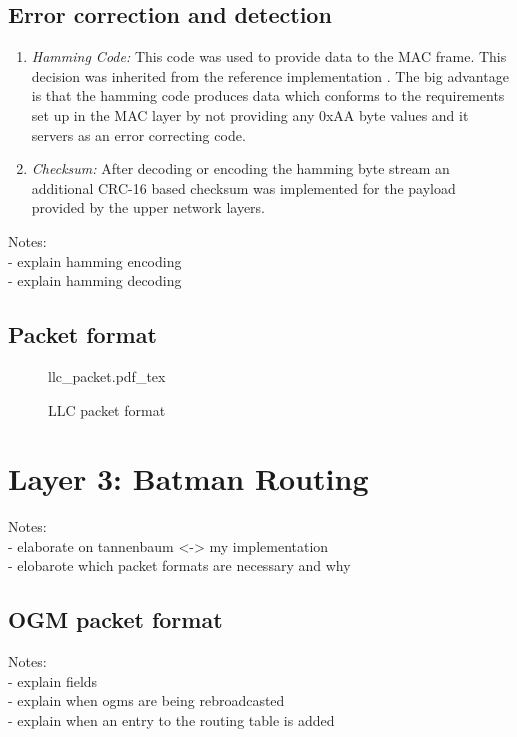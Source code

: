 \subsection{Error correction and detection}
\begin{enumerate}
\item \emph{Hamming Code:} This code was used to provide data to the MAC frame. This decision was inherited from the reference implementation \cite{stahl}. The big advantage is that the hamming code produces data which conforms to the requirements set up in the MAC layer by not providing any 0xAA byte values and it servers as an error correcting code.
\item \emph{Checksum:} After decoding or encoding the hamming byte stream an additional CRC-16 based checksum was implemented for the payload provided by the upper network layers.
\end{enumerate}

Notes: \\
- explain hamming encoding \\
- explain hamming decoding \\

\subsection{Packet format}
\begin{figure}[H]
    \centering
    {llc_packet.pdf_tex}
    \caption{LLC packet format}
\end{figure}

\section{Layer 3: Batman Routing}
Notes:\\
- elaborate on tannenbaum <-> my implementation \\
- elobarote which packet formats are necessary and why \\

\subsection{OGM packet format}
Notes:\\
- explain fields\\
- explain when ogms are being rebroadcasted\\
- explain when an entry to the routing table is added\\

